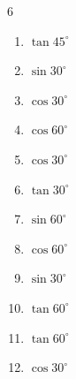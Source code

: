 \begin{multicols}{6}
\begin{enumerate}

  \item $\displaystyle \tan{45^\circ}$

        \phantom{$\displaystyle =1$}

\columnbreak %

  \item $\displaystyle \sin{30^\circ}$


  \item $\displaystyle \cos{30^\circ}$


  \item $\displaystyle \cos{60^\circ}$


  \item $\displaystyle \cos{30^\circ}$


  \item $\displaystyle \tan{30^\circ}$


  \item $\displaystyle \sin{60^\circ}$


  \item $\displaystyle \cos{60^\circ}$


  \item $\displaystyle \sin{30^\circ}$


  \item $\displaystyle \tan{60^\circ}$


  \item $\displaystyle \tan{60^\circ}$


  \item $\displaystyle \cos{30^\circ}$



\end{enumerate}
\end{multicols}
